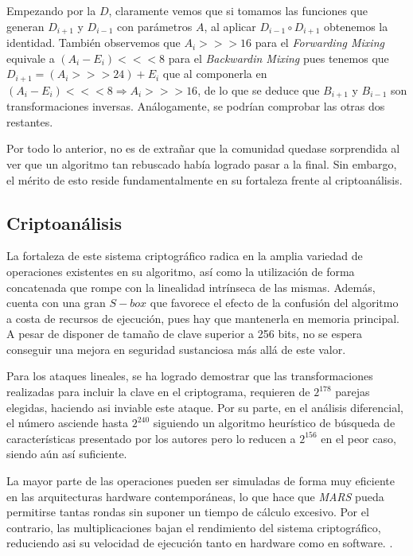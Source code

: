 Empezando por la $D$, claramente vemos que si tomamos las funciones que generan $D_{i+1}$ y $D_{i-1}$ con parámetros $A$, al aplicar $D_{i-1} \circ D_{i+1}$ obtenemos la identidad. También observemos que $A_i >>> 16$ para el \textit{Forwarding Mixing} equivale a $(A_i - E_i) <<< 8$ para el \textit{Backwardin Mixing} pues tenemos que $D_{i+1} = (A_i >>> 24) + E_i$ que al componerla en $(A_i - E_i) <<< 8 \Rightarrow A_i >>> 16$, de lo que se deduce que $B_{i+1}$ y $B_{i-1}$ son transformaciones inversas. Análogamente, se podrían comprobar las otras dos restantes.

Por todo lo anterior, no es de extrañar que la comunidad quedase sorprendida al ver que un algoritmo tan rebuscado había logrado pasar a la final. Sin embargo, el mérito de esto reside fundamentalmente en su fortaleza frente al criptoanálisis.

\subsection{Criptoanálisis}
La fortaleza de este sistema criptográfico radica en la amplia variedad de operaciones \cite{MARS_AES} existentes en su algoritmo, así como la utilización de forma concatenada que rompe con la linealidad intrínseca de las mismas. Además, cuenta con una gran $S-box$ que favorece el efecto de la confusión del algoritmo a costa de recursos de ejecución, pues hay que mantenerla en memoria principal. A pesar de disponer de tamaño de clave superior a 256 bits, no se espera conseguir una mejora en seguridad sustanciosa más allá de este valor.

Para los ataques lineales, se ha logrado demostrar que las transformaciones realizadas para incluir la clave en el criptograma, requieren de $2^{178}$ parejas elegidas, haciendo asi inviable este ataque. Por su parte, en el análisis diferencial, el número asciende hasta $2^{240}$ siguiendo un algoritmo heurístico de búsqueda de características presentado por los autores pero lo reducen a $2^{156}$ en el peor caso, siendo aún así suficiente.

La mayor parte de las operaciones pueden ser simuladas de forma muy eficiente en las arquitecturas hardware contemporáneas, lo que hace que \textit{MARS} pueda permitirse tantas rondas sin suponer un tiempo de cálculo excesivo. Por el contrario, las multiplicaciones bajan el rendimiento del sistema criptográfico, reduciendo asi su velocidad de ejecución tanto en hardware como en software.
\cite{MARS_Alg}\cite{MARS_AES}.

